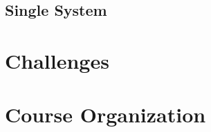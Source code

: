 \subsection{Single System}

%

\lessonslearned{
	\item \ldots
}{
	\item \ldots
}{
	\ldots
}

\sectionend

\section{Challenges}





\lessonslearned{
	\item \ldots
}{
	\item \ldots
}{
	\ldots
}

\sectionend

\section{Course Organization}




\lessonslearned{
	\item \ldots
}{
	\item \ldots
}{
	\ldots
}




